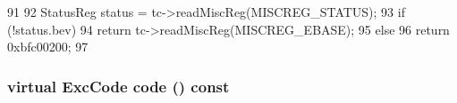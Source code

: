 \begin{DoxyCode}
91     {
92         StatusReg status = tc->readMiscReg(MISCREG_STATUS);
93         if (!status.bev)
94             return tc->readMiscReg(MISCREG_EBASE);
95         else
96             return 0xbfc00200;
97     }
\end{DoxyCode}
\hypertarget{classMipsISA_1_1MipsFaultBase_a61bd3af5e2aa0d5447807e9fe98769be}{
\subsubsection[{code}]{\setlength{\rightskip}{0pt plus 5cm}virtual {\bf ExcCode} code () const}}
\label{classMipsISA_1_1MipsFaultBase_a61bd3af5e2aa0d5447807e9fe98769be}


